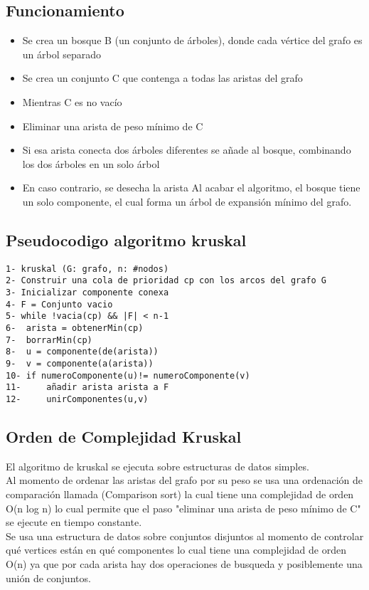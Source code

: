 \documentclass[12pt,twoside]{article}
\begin{document}
\subsection{Funcionamiento}
\begin{itemize}
    \item Se crea un bosque B (un conjunto de árboles), donde cada vértice del grafo es un árbol separado
    \item Se crea un conjunto C que contenga a todas las aristas del grafo
    \item Mientras C es no vacío
    \item Eliminar una arista de peso mínimo de C
    \item Si esa arista conecta dos árboles diferentes se añade al bosque, combinando los dos árboles en un solo árbol
    \item En caso contrario, se desecha la arista
Al acabar el algoritmo, el bosque tiene un solo componente, el cual forma un árbol de expansión mínimo del grafo.
\end{itemize}

\subsection{Pseudocodigo algoritmo kruskal}
\begin{lstlisting}
1- kruskal (G: grafo, n: #nodos)
2- Construir una cola de prioridad cp con los arcos del grafo G
3- Inicializar componente conexa
4- F = Conjunto vacio
5- while !vacia(cp) && |F| < n-1
6- 	arista = obtenerMin(cp)
7-	borrarMin(cp)
8-	u = componente(de(arista))
9-	v = componente(a(arista))
10-	if numeroComponente(u)!= numeroComponente(v)
11-		añadir arista arista a F
12-		unirComponentes(u,v)
\end{lstlisting}

\subsection{Orden de Complejidad Kruskal}
El algoritmo de kruskal se ejecuta sobre estructuras de datos simples.\\

Al momento de ordenar las aristas del grafo por su peso se usa una ordenación de comparación
llamada (Comparison sort) la cual tiene una complejidad de orden O(n log n) lo cual permite
que el paso "eliminar una arista de peso mínimo de C" se ejecute en tiempo constante.\\

Se usa una estructura de datos sobre conjuntos disjuntos al momento de controlar qué vertices
están en qué componentes lo cual tiene una complejidad de orden O(n) ya que por cada arista
hay dos operaciones de busqueda y posiblemente una unión de conjuntos.\\
\end{document}
